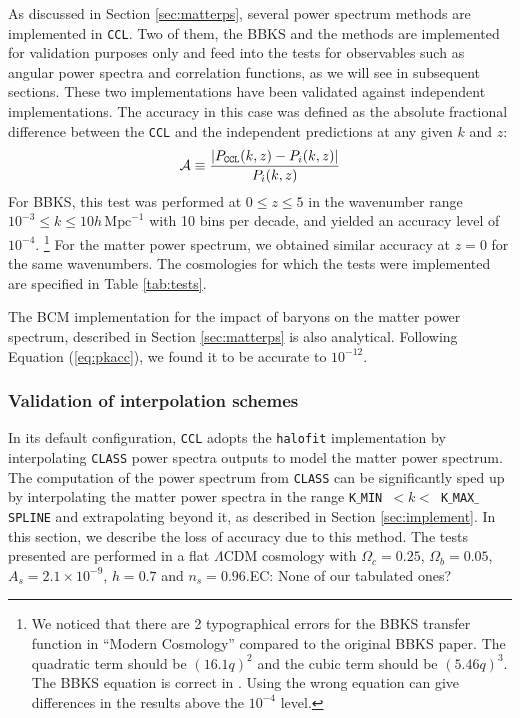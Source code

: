 \documentclass[\docopts]{\docclass}
\newcommand{\elisa}[1]{\textcolor{green!10!orange!90!}{EC: #1}}
\newcommand{\ccl}{{\tt CCL}\xspace}
\newcommand{\halofit}{{\tt halofit}\xspace}
\newcommand{\class}{{\tt CLASS}\xspace}
\begin{document}
As discussed in Section \ref{sec:matterps}, several power spectrum methods are implemented in \ccl. Two of them, the BBKS \citep{BBKS} and the \citet{1998ApJ...496..605E} methods are implemented for validation purposes only and feed into the tests for observables such as angular power spectra and correlation functions, as we will see in subsequent sections. These two implementations have been validated against independent implementations. The accuracy in this case was defined as the absolute fractional difference between the \ccl and the independent predictions at any given $k$ and $z$:
\begin{equation}
  \mathcal{A}\equiv \frac{|P_{\tt CCL}(k,z)-P_{i}(k,z)|}{P_i(k,z)}
  \label{eq:pkacc}
\end{equation}
For BBKS, this test was performed at $0\leq z \leq 5$ in the wavenumber range $10^{-3} \leq k \leq 10 h\,\text{Mpc}^{-1}$ with 10 bins per decade, and yielded an accuracy level of $10^{-4}$.
\footnote{We noticed that there are 2 typographical errors for the BBKS transfer function in ``Modern Cosmology'' \citep{DodelsonBook} compared to the original BBKS paper. The quadratic term should be $(16.1q)^2$ and the cubic term should be $(5.46q)^3$. The BBKS equation is correct in \citet{PeacockBook}. Using the wrong equation can give differences in the results above the $10^{-4}$ level.}
For the \citet{1998ApJ...496..605E} matter power spectrum, we obtained similar accuracy at $z=0$ for the same wavenumbers. The cosmologies for which the tests were implemented are specified in Table \ref{tab:tests}.

The BCM implementation for the impact of baryons on the matter power spectrum, described in Section \ref{sec:matterps} is also analytical. Following Equation (\ref{eq:pkacc}), we found it to be accurate to $10^{-12}$.

\subsubsection{Validation of interpolation schemes}
\label{ss:classval}

In its default configuration, \ccl adopts the \halofit \citep{CLASS_halofit} implementation by interpolating \class power spectra outputs to model the matter power spectrum. The computation of the power spectrum from \class can be significantly sped up by interpolating the matter power spectra in the range {\tt K$\_$MIN}~$<k<$~{\tt K$\_$MAX$\_$SPLINE} and extrapolating beyond it, as described in Section \ref{sec:implement}. In this section, we describe the loss of accuracy due to this method. The tests presented are performed in a flat $\Lambda$CDM cosmology with $\Omega_c=0.25$, $\Omega_b=0.05$, $A_s=2.1\times10^{-9}$, $h=0.7$ and $n_s=0.96$.\elisa{None of our tabulated ones?}
\end{document}
